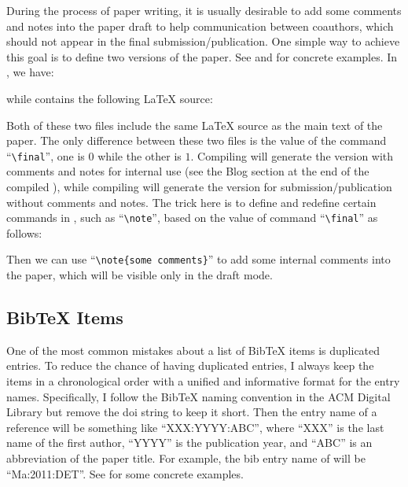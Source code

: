 During the process of paper writing, it is usually desirable to add some comments and notes into the paper draft to help communication between coauthors, which should not appear in the final submission/publication.
One simple way to achieve this goal is to define two versions of the paper. See  and  for concrete examples.
In , we have:
\begin{latexexample}
\newcommand{\final}{0}

\end{latexexample}
while  contains the following LaTeX source:
\begin{latexexample}
\newcommand{\final}{1}

\end{latexexample}
Both of these two files include the same LaTeX source  as the main text of the paper. The only difference between these two files is the value of the command ``\verb|\final|'', one is $0$ while the other is $1$.
Compiling  will generate the version with comments and notes for internal use (see the Blog section at the end of the compiled ), while compiling  will generate the version for submission/publication without comments and notes.
The trick here is to define and redefine certain commands in , such as ``\verb|\note|'', based on the value of command ``\verb|\final|'' as follows:
\begin{latexexample}
\newcommand{\note}[1]{{\it\color{blue} #1}}
{
\renewcommand{\note}[1]{}
}
{}
\end{latexexample}
Then we can use ``\verb|\note{some comments}|'' to add some internal comments into the paper, which will be visible only in the draft mode.

\subsection{BibTeX Items}

One of the most common mistakes about a list of BibTeX items is duplicated entries.
To reduce the chance of having duplicated entries, I always keep the items in a chronological order with a unified and informative format for the entry names. Specifically, I follow the BibTeX naming convention in the ACM Digital Library but remove the doi string to keep it short.
Then the entry name of a reference will be something like ``XXX:YYYY:ABC'', where ``XXX'' is the last name of the first author, ``YYYY'' is the publication year, and ``ABC'' is an abbreviation of the paper title. For example, the bib entry name of \cite{Ma:2011:DET} will be ``Ma:2011:DET''.
See  for some concrete examples.
